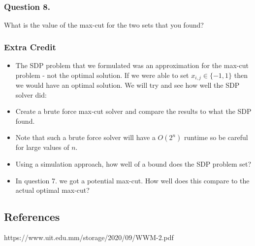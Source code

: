 \documentclass{article}
\begin{document}
\subsubsection{Question 8.}
What is the value of the max-cut for the two sets that you found?


\subsubsection{Extra Credit}
\begin{itemize}
\item\label{item:1} The SDP problem that we formulated was an approximation for the max-cut problem - not the optimal solution. If we were able to set \( x_{i, j} \in \{ -1, 1 \} \) then we would have an optimal solution. We will try and see how well the SDP solver did:
\item\label{item:2}
Create a brute force max-cut solver and compare the results to what the SDP found.
\item\label{item:3}
Note that such a brute force solver will have a \( O(2^n) \) runtime so be careful for large values of \( n \).
\item\label{item:4}
Using a simulation approach, how well of a bound does the SDP problem set?
\item\label{item:5}
In question 7. we got a potential max-cut. How well does this compare to the actual optimal max-cut?
\end{itemize}



\newpage
\subsection{References}
https://www.uit.edu.mm/storage/2020/09/WWM-2.pdf
\end{document}

